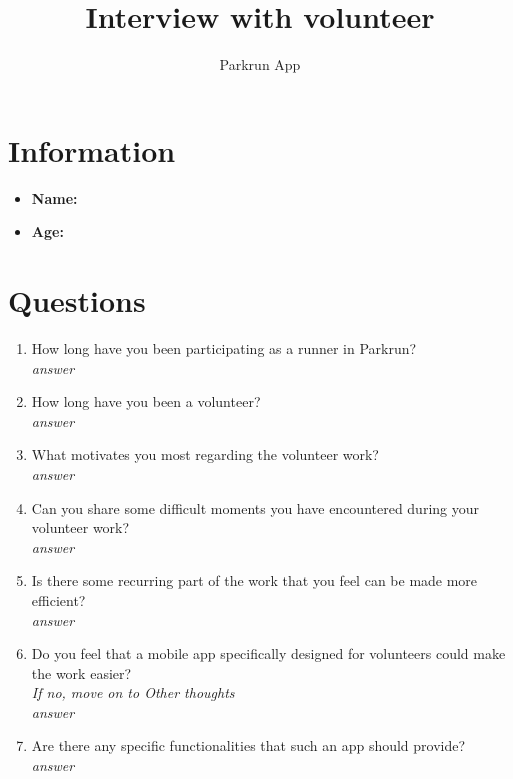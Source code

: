 \documentclass{article}
\title{\textbf{Interview with volunteer}}
\author{Parkrun App}
\date{}
\begin{document}
\maketitle
\thispagestyle{empty}
\section*{Information}
\begin{itemize}[label=]
    \item \textbf{Name:} 
    \item \textbf{Age:} 
\end{itemize}

\section*{Questions}
\begin{enumerate}[label=\textbf{Question \arabic*:}]
    \item How long have you been participating as a runner in Parkrun?\\
        \textit{answer}
    \item How long have you been a volunteer?\\
        \textit{answer}
    \item What motivates you most regarding the volunteer work?\\
        \textit{answer}
    \item Can you share some difficult moments you have encountered during your volunteer work?\\
        \textit{answer}
    \item Is there some recurring part of the work that you feel can be made more efficient?\\
        \textit{answer}
    \item Do you feel that a mobile app specifically designed for volunteers could make the work easier?\\
    \textit{If no, move on to Other thoughts}\\
        \textit{answer}
    \item Are there any specific functionalities that such an app should provide?\\
        \textit{answer}
\end{enumerate}

\newpage
\end{document}
